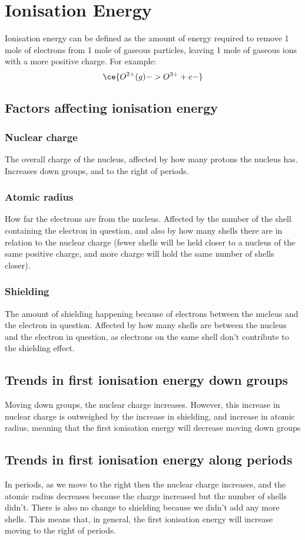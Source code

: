 \section{Ionisation Energy}
Ionisation energy can be defined as the amount of energy required to remove 1 mole of electrons from 1 mole of gaseous particles, leaving 1 mole of gaseous ions with a more positive charge. For example:
\begin{equation}
	\ce{O^{2+}(g) -> O^{3+} + e-}
\end{equation}

\subsection{Factors affecting ionisation energy}
\subsubsection{Nuclear charge}
The overall charge of the nucleus, affected by how many protons the nucleus has. Increases down groups, and to the right of periods.
\subsubsection{Atomic radius}
How far the electrons are from the nucleus. Affected by the number of the shell containing the electron in question, and also by how many shells there are in relation to the nuclear charge (fewer shells will be held closer to a nucleus of the same positive charge, and more charge will hold the same number of shells closer).
\subsubsection{Shielding}
The amount of shielding happening because of electrons between the nucleus and the electron in question. Affected by how many shells are between the nucleus and the electron in question, as electrons on the same shell don't contribute to the shielding effect.

\subsection{Trends in first ionisation energy down groups}
Moving down groups, the nuclear charge increases. However, this increase in nuclear charge is outweighed by the increase in shielding, and increase in atomic radius, meaning that the first ionisation energy will decrease moving down groups
\subsection{Trends in first ionisation energy along periods}
In periods, as we move to the right then the nuclear charge increases, and the atomic radius decreases because the charge increased but the number of shells didn't. There is also no change to shielding because we didn't add any more shells. This means that, in general, the first ionisation energy will increase moving to the right of periods.
